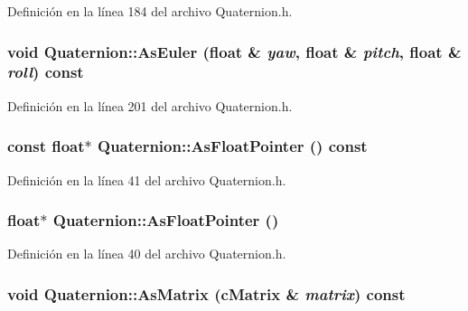 Definición en la línea 184 del archivo Quaternion.h.

\hypertarget{struct_quaternion_ac1fad9f2d56b2364a082ca750a26f6b5}{
\subsubsection[{AsEuler}]{\setlength{\rightskip}{0pt plus 5cm}void Quaternion::AsEuler (float \& {\em yaw}, \/  float \& {\em pitch}, \/  float \& {\em roll}) const}}
\label{struct_quaternion_ac1fad9f2d56b2364a082ca750a26f6b5}


Definición en la línea 201 del archivo Quaternion.h.

\hypertarget{struct_quaternion_ab0f9d23602fdd6b8a824f7a22db02d13}{
\subsubsection[{AsFloatPointer}]{\setlength{\rightskip}{0pt plus 5cm}const float$\ast$ Quaternion::AsFloatPointer () const}}
\label{struct_quaternion_ab0f9d23602fdd6b8a824f7a22db02d13}


Definición en la línea 41 del archivo Quaternion.h.

\hypertarget{struct_quaternion_a6eb6dec27fa8bb0a7ece63519e365647}{
\subsubsection[{AsFloatPointer}]{\setlength{\rightskip}{0pt plus 5cm}float$\ast$ Quaternion::AsFloatPointer ()}}
\label{struct_quaternion_a6eb6dec27fa8bb0a7ece63519e365647}


Definición en la línea 40 del archivo Quaternion.h.

\hypertarget{struct_quaternion_ab0ec79d0fc86a863a4721af8bca5226d}{
\subsubsection[{AsMatrix}]{\setlength{\rightskip}{0pt plus 5cm}void Quaternion::AsMatrix ({\bf cMatrix} \& {\em matrix}) const}}
\label{struct_quaternion_ab0ec79d0fc86a863a4721af8bca5226d}


